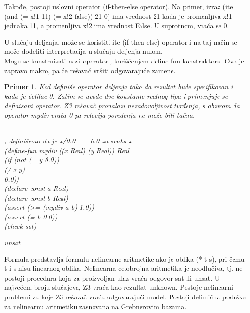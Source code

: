 \documentclass[12pt,oneside]{memoir}
\newtheorem{primer}{Primer}
\begin{document}
Takođe, postoji uslovni operator (if-then-else operator). Na primer,
izraz (ite (and (= x!1 11) (= x!2 false)) 21 0) ima vrednost 21 kada je promenljiva x!1 jednaka 11, a promenljiva x!2 ima vrednost False. U suprotnom, vraća se 0.

U slučaju deljenja, može se koristiti ite (if-then-else) operator i na taj način se može dodeliti interpretacija u slučaju deljenja nulom.
\\
Mogu se konstruisati novi operatori, korišćenjem define-fun konstruktora. Ovo je zapravo makro, pa će rešavač vršiti odgovarajuće zamene.
\begin{primer} Kod definiše operator deljenja tako da rezultat bude specifikovan i kada je delilac 0. Zatim se uvode dve konstante realnog tipa i primenjuje se definisani operator. Z3 rešavač pronalazi nezadovoljivost tvrđenja, s obzirom da operator mydiv vraća 0 pa relacija poređenja ne može biti tačna.\\ \\
\begin{minipage}[b]{0.4\textwidth}
; definišemo da je x/0.0 == 0.0 za svako x
\\(define-fun mydiv ((x Real) (y Real)) Real
\\  (if (not (= y 0.0))
\\      (/ x y)
\\      0.0))
\\(declare-const a Real)
\\(declare-const b Real)
\\(assert (>= (mydiv a b) 1.0))
\\(assert (= b 0.0))
\\(check-sat)

\end{minipage}
\hspace{1.5cm}
\begin{minipage}[t]{0.4\textwidth}
\vspace{-7.25cm}
unsat
\end{minipage}
\end{primer}


Formula predstavlja formulu nelinearne aritmetike ako je oblika (* t s), pri čemu t i s nisu linearnog oblika.
Nelinearna celobrojna aritmetika je neodlučiva, tj. ne postoji procedura koja za proizvoljan ulaz vraća odgovor sat ili unsat. U najvećem broju slučajeva, Z3 vraća kao rezultat unknown. Postoje nelinearni problemi za koje Z3 rešavač vraća odgovarajući model.
Postoji delimična podrška za nelinearnu aritmetiku zasnovana na Grebnerovim bazama.
\end{document}
